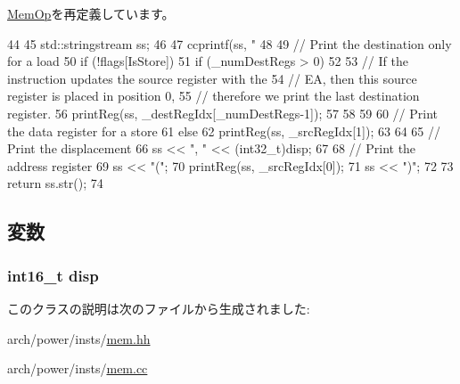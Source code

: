 \hyperlink{classPowerISA_1_1MemOp_a95d323a22a5f07e14d6b4c9385a91896}{MemOp}を再定義しています。


\begin{DoxyCode}
44 {
45     std::stringstream ss;
46 
47     ccprintf(ss, "%
48 
49     // Print the destination only for a load
50     if (!flags[IsStore]) {
51         if (_numDestRegs > 0) {
52 
53             // If the instruction updates the source register with the
54             // EA, then this source register is placed in position 0,
55             // therefore we print the last destination register.
56             printReg(ss, _destRegIdx[_numDestRegs-1]);
57         }
58     }
59 
60     // Print the data register for a store
61     else {
62         printReg(ss, _srcRegIdx[1]);
63     }
64 
65     // Print the displacement
66     ss << ", " << (int32_t)disp;
67 
68     // Print the address register
69     ss << "(";
70     printReg(ss, _srcRegIdx[0]);
71     ss << ")";
72 
73     return ss.str();
74 }
\end{DoxyCode}


\subsection{変数}
\hypertarget{classPowerISA_1_1MemDispOp_a0bf57a15d1f3322678bf01a87b20a11b}{
\subsubsection[{disp}]{\setlength{\rightskip}{0pt plus 5cm}int16\_\-t {\bf disp}}}
\label{classPowerISA_1_1MemDispOp_a0bf57a15d1f3322678bf01a87b20a11b}


このクラスの説明は次のファイルから生成されました:\begin{DoxyCompactItemize}
\item 
arch/power/insts/\hyperlink{power_2insts_2mem_8hh}{mem.hh}\item 
arch/power/insts/\hyperlink{power_2insts_2mem_8cc}{mem.cc}\end{DoxyCompactItemize}
